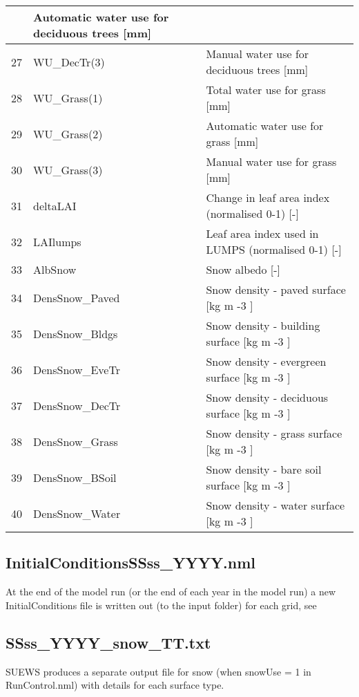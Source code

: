 \documentclass[letterpaper,10pt,english]{sphinxmanual}
\begin{document}
\begin{savenotes}
\begin{longtable}{|l|l|l|}
&
Automatic water use for deciduous trees {[}mm{]}
\\
\hline
27
&
WU\_DecTr(3)
&
Manual water use for deciduous trees {[}mm{]}
\\
\hline
28
&
WU\_Grass(1)
&
Total water use for grass {[}mm{]}
\\
\hline
29
&
WU\_Grass(2)
&
Automatic water use for grass {[}mm{]}
\\
\hline
30
&
WU\_Grass(3)
&
Manual water use for grass {[}mm{]}
\\
\hline
31
&
deltaLAI
&
Change in leaf area index (normalised 0-1) {[}-{]}
\\
\hline
32
&
LAIlumps
&
Leaf area index used in LUMPS (normalised 0-1) {[}-{]}
\\
\hline
33
&
AlbSnow
&
Snow albedo {[}-{]}
\\
\hline
34
&
DensSnow\_Paved
&
Snow density - paved surface {[}kg m -3 {]}
\\
\hline
35
&
DensSnow\_Bldgs
&
Snow density - building surface {[}kg m -3 {]}
\\
\hline
36
&
DensSnow\_EveTr
&
Snow density - evergreen surface {[}kg m -3 {]}
\\
\hline
37
&
DensSnow\_DecTr
&
Snow density - deciduous surface {[}kg m -3 {]}
\\
\hline
38
&
DensSnow\_Grass
&
Snow density - grass surface {[}kg m -3 {]}
\\
\hline
39
&
DensSnow\_BSoil
&
Snow density - bare soil surface {[}kg m -3 {]}
\\
\hline
40
&
DensSnow\_Water
&
Snow density - water surface {[}kg m -3 {]}
\\
\hline
\end{longtable}\sphinxatlongtableend\end{savenotes}


\subsection{InitialConditionsSSss\_YYYY.nml}
\label{\detokenize{output_files/output_files:initialconditionsssss-yyyy-nml}}\label{\detokenize{output_files/output_files:initialconditionsssss-yyyy-nml-1}}
At the end of the model run (or the end of each year in the model run) a
new InitialConditions file is written out (to the input folder) for each
grid, see 


\subsection{SSss\_YYYY\_snow\_TT.txt}
\label{\detokenize{output_files/output_files:ssss-yyyy-snow-tt-txt}}
SUEWS produces a separate output file for snow (when snowUse = 1 in
RunControl.nml) with details for each surface type.
\end{document}
